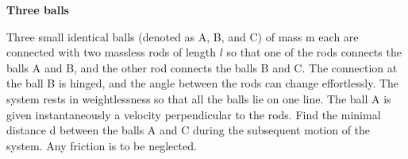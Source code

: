 {\Large\textbf{Three balls}}

Three small identical balls (denoted as A, B, and C) of mass m each are
connected with two massless rods of length $l$ so that one of the rods connects
the balls A and B, and the other rod connects the balls B and C. The connection
at the ball B is hinged, and the angle between the rods can change
effortlessly. The system rests in weightlessness so that all the balls lie on
one line. The ball A is given instantaneously a velocity perpendicular to the
rods. Find the minimal distance d between the balls A and C during the
subsequent motion of the system. Any friction is to be neglected.
